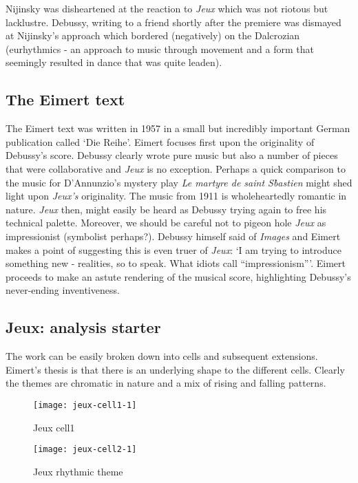Nijinsky was disheartened at the reaction to \textit{Jeux} which was not riotous but lacklustre. Debussy, writing to a friend shortly after the premiere was dismayed at Nijinsky's approach which bordered (negatively) on the Dalcrozian (eurhythmics - an approach to music through movement and a form that seemingly resulted in dance that was quite leaden). 


\subsection{The Eimert text}
The Eimert text was written in 1957 in a small but incredibly important German publication called `Die Reihe'. Eimert focuses first upon the originality of Debussy's score. Debussy clearly wrote pure music but also a number of pieces that were collaborative and \textit{Jeux} is no exception. Perhaps a quick comparison to the music for D'Annunzio's mystery play \textit{Le martyre de saint S\`bastien} might shed light upon \textit{Jeux's} originality. The music from 1911 is wholeheartedly romantic in nature. \textit{Jeux} then, might easily be heard as Debussy trying again to free his technical palette. Moreover, we should be careful not to pigeon hole \textit{Jeux} as impressionist (symbolist perhaps?). Debussy himself said of \textit{Images} and Eimert makes a point of suggesting this is even truer of \textit{Jeux}: `I am trying to introduce something new - realities, so to speak. What idiots call ``impressionism'''. Eimert proceeds to make an astute rendering of the musical score, highlighting Debussy's never-ending inventiveness.  

\subsection{Jeux: analysis starter}
The work can be easily broken down into cells and subsequent extensions. Eimert's thesis is that there is an underlying shape to the different cells. Clearly the themes are chromatic in nature and a mix of rising and falling patterns. 

\begin{figure}[H]
\centering
\texttt{[image: jeux-cell1-1]}\caption{Jeux cell1}
\label{fig:jeux1}
\end{figure}

\begin{figure}[H]
\centering
\texttt{[image: jeux-cell2-1]}\caption{Jeux rhythmic theme}
\label{fig:jeux2}
\end{figure}


